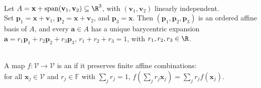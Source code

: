 \begin{example} \label{ex:barycentric-coordinates-on-plane} \\
Let $A=\mathbf{x}+\operatorname{span}(\mathbf{v}_1,\mathbf{v}_2)\subseteq\R^3$, with $(\mathbf{v}_1,\mathbf{v}_2)$ linearly independent.\\
Set $\mathbf{p}_1=\mathbf{x}+\mathbf{v}_1$, $\mathbf{p}_2=\mathbf{x}+\mathbf{v}_2$, and $\mathbf{p}_3=\mathbf{x}$. Then $(\mathbf{p}_1,\mathbf{p}_2,\mathbf{p}_3)$ is an ordered affine basis of $A$, and every $\mathbf{a}\in A$ has a unique barycentric expansion $\mathbf{a}=r_1\mathbf{p}_1+r_2\mathbf{p}_2+r_3\mathbf{p}_3$, $r_1+r_2+r_3=1$, with $r_1,r_2,r_3\in\R$.
\end{example}

\begin{definition} \label{def:affine-transformation} \\
A map $f:\mathcal{V}\to\mathcal{V}$ is an  if it preserves finite affine combinations:\\
for all $\mathbf{x}_j\in\mathcal{V}$ and $r_j\in\mathbb{F}$ with $\sum\limits_j r_j=1$, $f\left(\sum\limits_j r_j\mathbf{x}_j\right)=\sum\limits_j r_j f(\mathbf{x}_j)$.
\end{definition}

